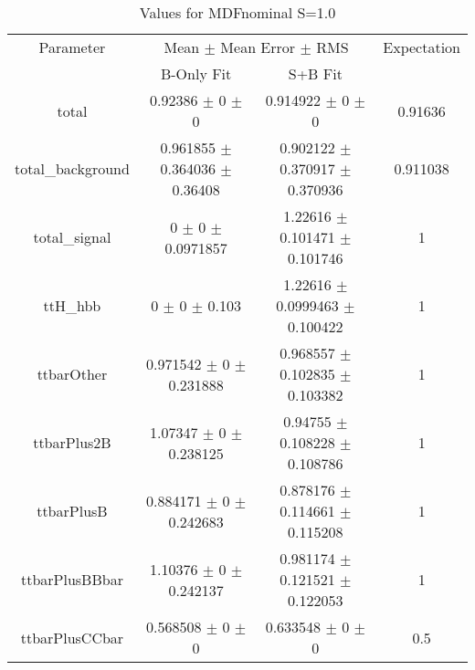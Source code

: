 \begin{table}
\centering
\caption{Values for MDFnominal S=1.0}
\begin{tabular}{cccc}
\toprule
Parameter & \multicolumn{2}{c}{Mean $\pm$ Mean Error $\pm$ RMS} & Expectation\\
 & B-Only Fit & S+B Fit & \\
\midrule
total & \num{0.92386} $\pm$ \num{0} $\pm$ \num{0} & \num{0.914922} $\pm$ \num{0} $\pm$ \num{0} & \num{0.91636}\\
total\_background & \num{0.961855} $\pm$ \num{0.364036} $\pm$ \num{0.36408} & \num{0.902122} $\pm$ \num{0.370917} $\pm$ \num{0.370936} & \num{0.911038}\\
total\_signal & \num{0} $\pm$ \num{0} $\pm$ \num{0.0971857} & \num{1.22616} $\pm$ \num{0.101471} $\pm$ \num{0.101746} & \num{1}\\
ttH\_hbb & \num{0} $\pm$ \num{0} $\pm$ \num{0.103} & \num{1.22616} $\pm$ \num{0.0999463} $\pm$ \num{0.100422} & \num{1}\\
ttbarOther & \num{0.971542} $\pm$ \num{0} $\pm$ \num{0.231888} & \num{0.968557} $\pm$ \num{0.102835} $\pm$ \num{0.103382} & \num{1}\\
ttbarPlus2B & \num{1.07347} $\pm$ \num{0} $\pm$ \num{0.238125} & \num{0.94755} $\pm$ \num{0.108228} $\pm$ \num{0.108786} & \num{1}\\
ttbarPlusB & \num{0.884171} $\pm$ \num{0} $\pm$ \num{0.242683} & \num{0.878176} $\pm$ \num{0.114661} $\pm$ \num{0.115208} & \num{1}\\
ttbarPlusBBbar & \num{1.10376} $\pm$ \num{0} $\pm$ \num{0.242137} & \num{0.981174} $\pm$ \num{0.121521} $\pm$ \num{0.122053} & \num{1}\\
ttbarPlusCCbar & \num{0.568508} $\pm$ \num{0} $\pm$ \num{0} & \num{0.633548} $\pm$ \num{0} $\pm$ \num{0} & \num{0.5}\\
\bottomrule
\end{tabular}
\end{table}